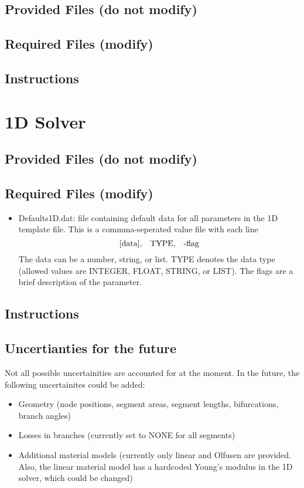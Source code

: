 \documentclass{UQDoc}
\begin{document}
\subsection{Provided Files (do not modify)}

\subsection{Required Files (modify)}

\subsection{Instructions}


\section{1D Solver} \label{CMF:sec:1D}
\subsection{Provided Files (do not modify)}

\subsection{Required Files (modify)}
\begin{itemize}
	\item Defaults1D.dat: file containing default data for all parameters in the 1D template file. This is a commma-seperated value file with each line $$\text{[data],\quad TYPE,\quad -flag}$$ 
	The data can be a number, string, or list. TYPE denotes the data type (allowed values are INTEGER, FLOAT, STRING, or LIST). The flags are a brief description of the parameter. 
\end{itemize}

\subsection{Instructions}

\subsection{Uncertianties for the future}
Not all possible uncertainities are accounted for at the moment. In the future, the following uncertainites could be added:
\begin{itemize}
	\item Geometry (node positions, segment areas, segment lengths, bifurcations, branch angles)
	\item Losses in branches (currently set to NONE for all segments)
	\item Additional material models (currently only linear and Olfusen are provided. Also, the linear material model has a hardcoded Young's modulus in the 1D solver, which could be changed)
\end{itemize}
\end{document}

